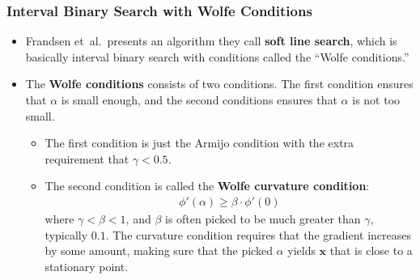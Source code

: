 \documentclass[10pt]{article}
\newcommand{\ve}[1]{\mathbf{#1}}
\newcommand{\etal}{{et~al.}}
\begin{document}
\subsubsection{Interval Binary Search with Wolfe Conditions}

\begin{itemize}
    \item Frandsen \etal\ presents an algorithm they call {\bf soft line search}, which is basically interval binary search with conditions called the ``Wolfe conditions.'' 
    
    \item The {\bf Wolfe conditions} \cite{Cao:2021} consists of two conditions. The first condition ensures that $\alpha$ is small enough, and the second conditions ensures that $\alpha$ is not too small.
    \begin{itemize}
        \item The first condition is just the Armijo condition with the extra requirement that $\gamma < 0.5$.
        \item The second condition is called the {\bf Wolfe curvature condition}:
        \begin{align*}
            \phi'(\alpha) \geq \beta \cdot \phi'(0)
        \end{align*}
        where $\gamma < \beta < 1$, and $\beta$ is often picked to be much greater than $\gamma$, typically $0.1$. The curvature condition requires that the gradient increases by some amount, making sure that the picked $\alpha$ yields $\ve{x}$ that is close to a stationary point.
    \end{itemize}
\end{itemize}




\end{document}
